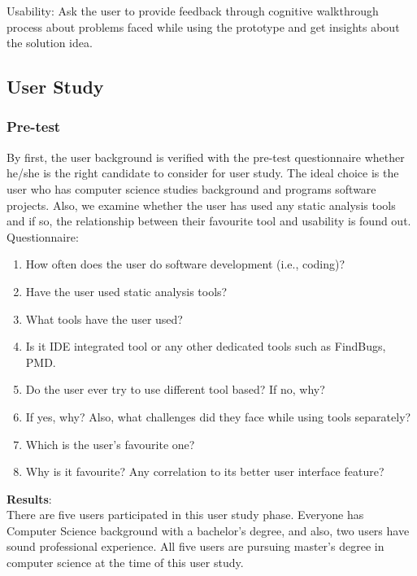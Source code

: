Usability: Ask the user to provide feedback through cognitive walkthrough process about problems faced while using the prototype and get insights about the solution idea. \\

\subsection{User Study}

\subsubsection{Pre-test}

By first, the user background is verified with the pre-test questionnaire whether he/she is the right candidate to consider for user study. The ideal choice is the user who has computer science studies background and programs software projects. Also, we examine whether the user has used any static analysis tools and if so, the relationship between their favourite tool and usability is found out. \\

Questionnaire: \\

\begin{enumerate}
\item How often does the user do software development (i.e., coding)?
\item Have the user used static analysis tools?
\item What tools have the user used?
\item Is it IDE integrated tool or any other dedicated tools such as FindBugs, PMD.
\item Do the user ever try to use different tool based?  If no, why?
\item If yes, why? Also, what challenges did they face while using tools separately?
\item Which is the user’s favourite one? 
\item Why is it favourite? Any correlation to its better user interface feature?
\end{enumerate}

\textbf{Results}: \\

There are five users participated in this user study phase. Everyone has Computer Science background with a bachelor’s degree, and also, two users have sound professional experience. All five users are pursuing master’s degree in computer science at the time of this user study. \\

